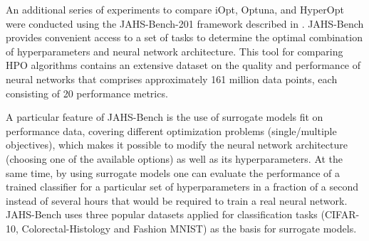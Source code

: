 \documentclass[iicol]{sn-jnl}
\theoremstyle{thmstyleone}%
\theoremstyle{thmstyletwo}%
\theoremstyle{thmstylethree}%
\begin{document}
An additional series of experiments to compare iOpt, Optuna, and HyperOpt were conducted using the JAHS-Bench-201 framework described in \citet{jahsbench}. JAHS-Bench provides convenient access to a set of tasks to determine the optimal combination of hyperparameters and neural network architecture. This tool for comparing HPO algorithms contains an extensive dataset on the quality and performance of neural networks that comprises approximately 161 million data points, each consisting of 20 performance metrics.

\begin{table}
\centering
\caption{Values of optimized metrics for the algorithms averaged over 10 runs (surrogate models)}
\label{tab:met-surr}
\end{table}

A particular feature of JAHS-Bench is the use of surrogate models fit on performance data, covering different optimization problems (single/multiple objectives), which makes it possible to modify the neural network architecture (choosing one of the available options) as well as its hyperparameters. At the same time, by using surrogate models one can evaluate the performance of a trained classifier for a particular set of hyperparameters in a fraction of a second instead of several hours that would be required to train a real neural network. JAHS-Bench uses three popular datasets applied for classification tasks (CIFAR-10, Colorectal-Histology and Fashion MNIST) as the basis for surrogate models.
\end{document}
